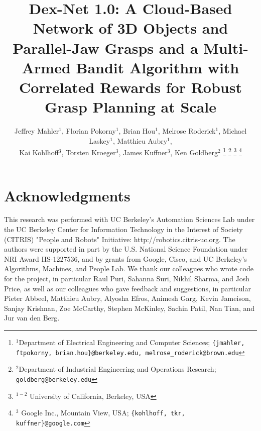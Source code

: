 \documentclass[letterpaper, 10 pt, conference]{ieeeconf}  %
\begin{document}
\title{\LARGE \bf Dex-Net 1.0: A Cloud-Based Network of 3D Objects and Parallel-Jaw Grasps and a Multi-Armed Bandit Algorithm with Correlated Rewards for Robust Grasp Planning at Scale
		}
\author{Jeffrey Mahler$^1$, Florian Pokorny$^1$, Brian Hou$^1$, Melrose Roderick$^1$, Michael Laskey$^1$, Matthieu Aubry$^1$, \\
Kai Kohlhoff$^3$, Torsten Kroeger$^3$, James Kuffner$^3$, Ken Goldberg$^2$
\thanks{$^1$Department of Electrical Engineering and Computer Sciences; {\tt\small \{jmahler, ftpokorny, brian.hou\}@berkeley.edu, melrose\_roderick@brown.edu}}%
\thanks{$^2$Department of Industrial Engineering and Operations Research; {\tt\small goldberg@berkeley.edu}}%
\thanks{$^{1-2}$ University of California, Berkeley, USA}%
\thanks{$^3$ Google Inc., Mountain View, USA; {\tt\small \{kohlhoff, tkr, kuffner\}@google.com}}
}
\maketitle



%


%


%




%

\section{Acknowledgments}
This research was performed with UC Berkeley's Automation Sciences Lab under the UC Berkeley Center for Information Technology in the Interest of Society (CITRIS) "People and Robots" Initiative: http://robotics.citris-uc.org.
The authors were supported in part by the U.S. National Science Foundation under NRI Award IIS-1227536, and by grants from Google, Cisco, and UC Berkeley's Algorithms, Machines, and People Lab.
We thank our colleagues who wrote code for the project, in particular Raul Puri, Sahanna Suri, Nikhil Sharma, and Josh Price, as well as our colleagues who gave feedback and suggestions, in particular Pieter Abbeel, Matthieu Aubry, Alyosha Efros, Animesh Garg, Kevin Jameison, Sanjay Krishnan, Zoe McCarthy, Stephen McKinley, Sachin Patil, Nan Tian, and Jur van den Berg.



\end{document}
